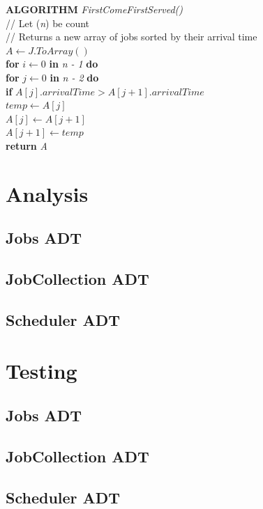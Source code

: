 \documentclass[12pt,a4paper]{article}
\begin{document}
			\textbf{ALGORITHM} \textit{FirstComeFirstServed()}\\
			\null\hspace{1cm}// Let (\textit{n}) be count\\
			\null\hspace{1cm}// Returns a new array of jobs sorted by their arrival time\\
			\null\hspace{1cm}\textit{$A \gets J.ToArray()$}\\
			\null\hspace{1cm}\textbf{for} \textit{$i \gets 0$} \textbf{in} \textit{n - 1} \textbf{do}\\
			\null\hspace{2cm}\textbf{for} \textit{$j \gets 0$} \textbf{in} \textit{n - 2} \textbf{do}\\
			\null\hspace{3cm}\textbf{if} \textit{$A[j].arrivalTime > A[j + 1].arrivalTime$}\\
			\null\hspace{4cm}\textit{$temp \gets A[j]$}\\
			\null\hspace{4cm}\textit{$A[j] \gets A[j + 1]$}\\
			\null\hspace{4cm}\textit{$A[j + 1] \gets temp$}\\
			\null\hspace{1cm}\textbf{return} \textit{A}\\
	
	\section{Analysis}
		\subsection{Jobs ADT}
		\subsection{JobCollection ADT}
		\subsection{Scheduler ADT}

	\section{Testing}
		\subsection{Jobs ADT}
		\subsection{JobCollection ADT}
		\subsection{Scheduler ADT}
\end{document}
